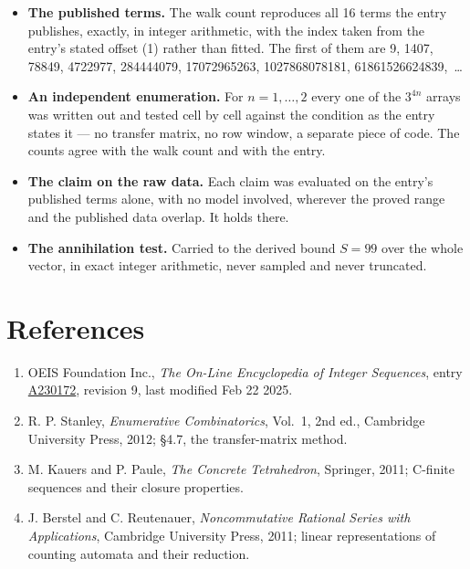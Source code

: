 \documentclass[11pt]{article}
\theoremstyle{definition}
\begin{document}
\begin{itemize}

\item {\bfseries The published terms.} The walk count reproduces all 16 terms the entry publishes, exactly, in integer arithmetic, with the index taken from the entry's stated offset (1) rather than fitted. The first of them are 9, 1407, 78849, 4722977, 284444079, 17072965263, 1027868078181, 61861526624839,~\dots

\item {\bfseries An independent enumeration.} For $n = 1,\dots,2$ every one of the $3^{4n}$ arrays was written out and tested cell by cell against the condition as the entry states it --- no transfer matrix, no row window, a separate piece of code. The counts agree with the walk count and with the entry.

\item {\bfseries The claim on the raw data.} Each claim was evaluated on the entry's published terms alone, with no model involved, wherever the proved range and the published data overlap. It holds there.

\item {\bfseries The annihilation test.} Carried to the derived bound $S = 99$ over the whole vector, in exact integer arithmetic, never sampled and never truncated.

\end{itemize}

\section{References}

\begin{enumerate}

\item OEIS Foundation Inc., \emph{The On-Line Encyclopedia of Integer Sequences}, entry \href{https://oeis.org/A230172}{A230172}, revision 9, last modified Feb 22 2025.

\item R. P. Stanley, \emph{Enumerative Combinatorics}, Vol.~1, 2nd ed., Cambridge University Press, 2012; \S4.7, the transfer-matrix method.

\item M. Kauers and P. Paule, \emph{The Concrete Tetrahedron}, Springer, 2011; C-finite sequences and their closure properties.

\item J. Berstel and C. Reutenauer, \emph{Noncommutative Rational Series with Applications}, Cambridge University Press, 2011; linear representations of counting automata and their reduction.

\end{enumerate}
\end{document}
